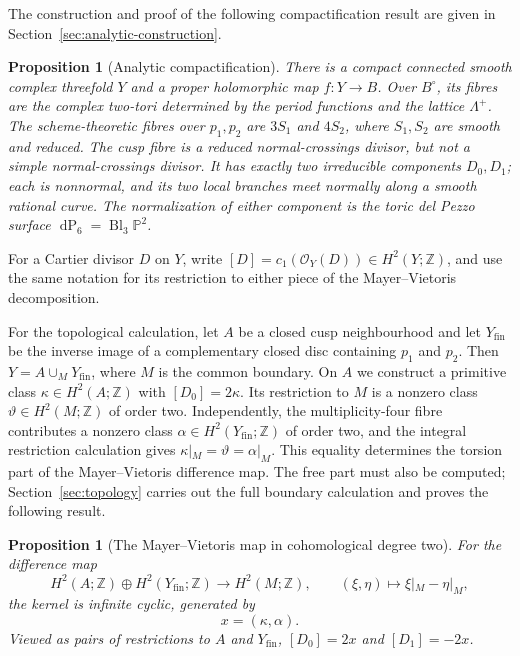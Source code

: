 \documentclass[11pt]{article}
\newtheorem{proposition}[theorem]{Proposition}
\theoremstyle{definition}
\theoremstyle{remark}
\numberwithin{equation}{section}
\newcommand{\PP}{\mathbb P}
\newcommand{\ZZ}{\mathbb Z}
\newcommand{\dP}{\operatorname{dP}_6}
\begin{document}
The construction and proof of the following compactification result are given
in Section~\ref{sec:analytic-construction}.

\begin{proposition}[Analytic compactification]\label{prop:analytic-model}
There is a compact connected smooth complex threefold $Y$ and a proper
holomorphic map $f:Y\to B$.  Over $B^\circ$, its fibres are the complex
two-tori determined by the period functions and the lattice $\Lambda^+$.  The
scheme-theoretic fibres over $p_1,p_2$ are $3S_1$ and $4S_2$, where
$S_1,S_2$ are smooth and reduced.  The cusp fibre is a reduced
normal-crossings divisor, but not a simple normal-crossings divisor.  It has
exactly two irreducible components $D_0,D_1$; each is nonnormal, and its two
local branches meet normally along a smooth rational curve.  The
normalization of either component is the toric del Pezzo surface
$\dP=\operatorname{Bl}_3\PP^2$.
\end{proposition}

For a Cartier divisor $D$ on $Y$, write
$[D]=c_1(\mathcal O_Y(D))\in H^2(Y;\mathbb Z)$, and use the same notation
for its restriction to either piece of the Mayer--Vietoris decomposition.

For the topological calculation, let $A$ be a closed cusp neighbourhood
and let $Y_{\mathrm{fin}}$ be the inverse image of a complementary closed
disc containing $p_1$ and $p_2$.  Then
$Y=A\cup_M Y_{\mathrm{fin}}$, where $M$ is the common boundary.  On
$A$ we construct a primitive class
$\kappa\in H^2(A;\ZZ)$ with $[D_0]=2\kappa$.  Its restriction to $M$ is
a nonzero class $\vartheta\in H^2(M;\ZZ)$ of order two.  Independently, the
multiplicity-four fibre contributes a nonzero class
$\alpha\in H^2(Y_{\mathrm{fin}};\ZZ)$ of order two, and the integral
restriction calculation gives
$\kappa|_M=\vartheta=\alpha|_M$.
This equality determines the torsion part of the Mayer--Vietoris difference
map.  The free part must also be computed; Section~\ref{sec:topology} carries
out the full boundary calculation and proves the following result.

\begin{proposition}[The Mayer--Vietoris map in cohomological degree two]
\label{prop:degree-two-mv}
For the difference map
\[
 H^2(A;\ZZ)\oplus H^2(Y_{\mathrm{fin}};\ZZ)
 \longrightarrow H^2(M;\ZZ),
 \qquad (\xi,\eta)\longmapsto \xi|_M-\eta|_M,
\]
the kernel is infinite cyclic, generated by
\begin{equation}\label{eq:x-generator}
 x=(\kappa,\alpha).
\end{equation}
Viewed as pairs of restrictions to $A$ and $Y_{\mathrm{fin}}$,
$[D_0]=2x$ and $[D_1]=-2x$.
\end{proposition}
\end{document}
